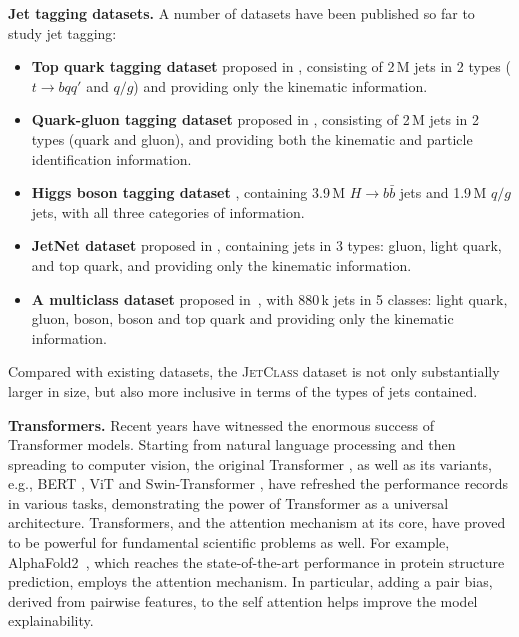 \documentclass[nohyperref]{article}
\theoremstyle{plain}
\theoremstyle{definition}
\theoremstyle{remark}
\newcommand{\jetclass}{{\textsc{JetClass}}\xspace}
\newcommand{\hbb}{\ensuremath{H\to b \bar{b}}\xspace}
\newcommand{\tbqq}{\ensuremath{t\to b q q'}\xspace}
\newcommand{\qgj}{\ensuremath{q/g}\xspace}
\begin{document}
\textbf{Jet tagging datasets.}
A number of datasets have been published so far to study jet tagging:
\begin{itemize}
    \vspace{-.2cm}
    \item \textbf{Top quark tagging dataset} \cite{kasieczkaTopQuarkTagging2019} proposed in \citet{Kasieczka:2019dbj}, consisting of 2\,M jets in 2 types (\tbqq and \qgj) and providing only the kinematic information.
    \vspace{-.2cm}
    \item \textbf{Quark-gluon tagging dataset} \cite{komiskePythia8QuarkGluon2019} proposed in \citet{Komiske:2018cqr}, consisting of 2\,M jets in 2 types (quark and gluon), and providing both the kinematic and particle identification information.
    \vspace{-.2cm}
    \item \textbf{Higgs boson tagging dataset} \cite{duarteSampleJetTrack2019,chenFAIRAIreadyHiggs2021}, containing 3.9\,M \hbb jets and 1.9\,M \qgj jets, with all three categories of information.  
    \vspace{-.2cm}
    \item \textbf{JetNet dataset} \cite{kansal_raghav_2021_5502543} proposed in \citet{kansalParticleCloudGeneration2021}, containing  jets in 3 types: gluon, light quark, and top quark, and providing only the kinematic information.
    \vspace{-.2cm}
    \item \textbf{A multiclass dataset} \cite{pierini_maurizio_2020_3602260} proposed in~\citet{Moreno:2019bmu}, with 880\,k jets in 5 classes: light quark, gluon,  boson,  boson and top quark and providing only the kinematic information.
    \vspace{-.2cm}
\end{itemize}
Compared with existing datasets, the \jetclass dataset is not only substantially larger in size, but also more inclusive in terms of the types of jets contained.

\textbf{Transformers.}
Recent years have witnessed the enormous success of Transformer models. Starting from natural language processing and then spreading to computer vision, the original Transformer \cite{vaswaniAttentionAllYou2017}, as well as its variants, e.g., BERT \cite{devlinBERTPretrainingDeep2019}, ViT \cite{dosovitskiy2021an} and Swin-Transformer \cite{Liu_2021_ICCV}, have refreshed the performance records in various tasks, demonstrating the power of Transformer as a universal architecture. 
Transformers, and the attention mechanism at its core, have proved to be powerful for fundamental scientific problems as well. For example, AlphaFold2~\cite{Jumper2021}, which reaches the state-of-the-art performance in protein structure prediction, employs the attention mechanism. In particular, adding a pair bias, derived from pairwise features, to the self attention helps improve the model explainability.
\end{document}
